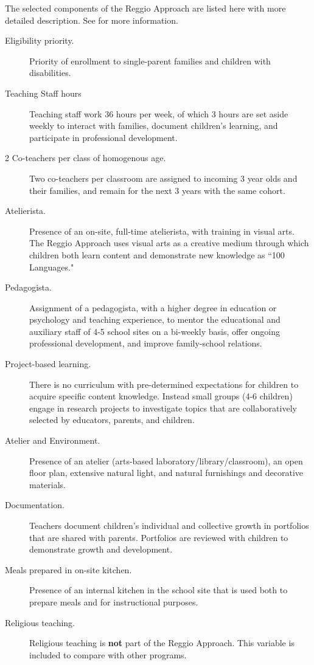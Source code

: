 The selected components of the Reggio Approach are listed here with more detailed description. See \citet{Rinaldi_2006_ReggioEmilia_BOOK,Giudici-Nicolosi_2014_Reggio-Approach, Cagliari-etal-eds_2016_BOOK_Loris-Malaguzzi} for more information.
\begin{description}
\item[Eligibility priority.] Priority of enrollment to single-parent families and children with disabilities.
\item[Teaching Staff hours] Teaching staff work 36 hours per week, of which 3 hours are set aside weekly to interact with families, document children's learning, and participate in professional development.
\item[2 Co-teachers per class of homogenous age.] Two co-teachers per classroom are assigned to incoming 3 year olds and their families, and remain for the next 3 years with the same cohort.
\item[Atelierista.] Presence of an on-site, full-time atelierista, with training in visual arts. The Reggio Approach uses visual arts as a creative medium through which children both learn content and demonstrate new knowledge as ``100 Languages."
\item[Pedagogista.] Assignment of a pedagogista, with a higher degree in education or psychology and teaching experience, to mentor the educational and auxiliary staff of 4-5 school sites on a bi-weekly basis, offer ongoing professional development, and improve family-school relations.
\item[Project-based learning.] There is no curriculum with pre-determined expectations for children to acquire specific content knowledge. Instead small groups (4-6 children) engage in research projects to investigate topics that are collaboratively selected by educators, parents, and children. 
\item[Atelier and Environment.] Presence of an atelier (arts-based laboratory/library/classroom), an open floor plan, extensive natural light, and natural furnishings and decorative materials.
\item[Documentation.] Teachers document children's individual and collective growth in portfolios that are shared with parents. Portfolios are reviewed with children to demonstrate growth and development.
\item[Meals prepared in on-site kitchen.] Presence of an internal kitchen in the school site that is used both to prepare meals and for instructional purposes.
\item[Religious teaching.] Religious teaching is \textbf{not} part of the Reggio Approach. This variable is included to compare with other programs.
\end{description}

